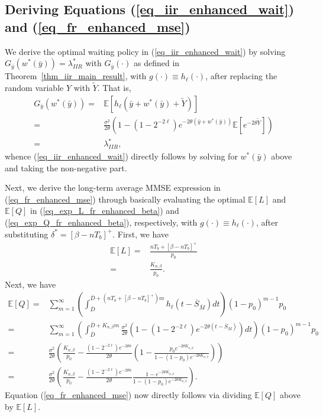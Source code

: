 \documentclass[12pt,journal,onecolumn]{IEEEtran}
\begin{document}
\subsection{Deriving Equations (\ref{eq_iir_enhanced_wait}) and (\ref{eq_fr_enhanced_mse})} \label{apndx_fr_enhanced_mse}

We derive the optimal waiting policy in (\ref{eq_iir_enhanced_wait}) by solving $G_{\bar{y}}\left(w^*(\bar{y})\right)=\lambda^*_{IIR}$ with $G_{\bar{y}}(\cdot)$ as defined in Theorem~\ref{thm_iir_main_result}, with $g(\cdot)\equiv h_\ell(\cdot)$, after replacing the random variable $Y$ with $\tilde{Y}$. That is,
\begin{align}
G_{\bar{y}}\left(w^*(\bar{y})\right)=&\mathbb{E}\left[h_{\ell}\left(\bar{y}+w^*(\bar{y})+\tilde{Y}\right)\right] \nonumber \\
=&\frac{\sigma^2}{2\theta}\left(1-\left(1-2^{-2\ell}\right)e^{-2\theta\left(\bar{y}+w^*(\bar{y})\right)}\mathbb{E}\left[e^{-2\theta\tilde{Y}}\right]\right) \nonumber \\
=&\lambda^*_{IIR},
\end{align}
whence (\ref{eq_iir_enhanced_wait}) directly follows by solving for $w^*(\bar{y})$ above and taking the non-negative part.

Next, we derive the long-term average MMSE expression in (\ref{eq_fr_enhanced_mse}) through basically evaluating the optimal $\mathbb{E}[L]$ and $\mathbb{E}[Q]$ in (\ref{eq_exp_L_fr_enhanced_beta}) and (\ref{eq_exp_Q_fr_enhanced_beta}), respectively, with $g(\cdot)\equiv h_\ell(\cdot)$, after substituting $\delta^*=\left[\beta-nT_b\right]^+$. First, we have
\begin{align}
\mathbb{E}[L]=&\frac{nT_b+\left[\beta-nT_b\right]^+}{p_0} \nonumber \\
=&\frac{K_{n,\beta}}{p_0}.
\end{align}
Next, we have
\begin{align}
\mathbb{E}[Q]=&\sum_{m=1}^\infty\left(\int_{\overline{D}}^{\overline{D}+\left(nT_b+\left[\beta-nT_b\right]^+\right)m}h_{\ell}\left(t-\overline{S}_{\bar{M}}\right)dt\right)(1-p_0)^{m-1}p_0 \nonumber \\
=&\sum_{m=1}^\infty\left(\int_{\overline{D}}^{\overline{D}+K_{n,\beta}m}\frac{\sigma^2}{2\theta}\left(1-\left(1-2^{-2\ell}\right)e^{-2\theta\left(t-\overline{S}_{\bar{M}}\right)}\right)dt\right)(1-p_0)^{m-1}p_0 \nonumber \\
=&\frac{\sigma^2}{2\theta}\left(\frac{K_{n,\beta}}{p_0}-\frac{\left(1-2^{-2\ell}\right)e^{-2\theta\bar{n}}}{2\theta}\left(1-\frac{p_0e^{-2\theta K_{n,\beta}}}{1-(1-p_0)e^{-2\theta K_{n,\beta}}}\right)\right) \nonumber \\
=&\frac{\sigma^2}{2\theta}\left(\frac{K_{n,\beta}}{p_0}-\frac{\left(1-2^{-2\ell}\right)e^{-2\theta\bar{n}}}{2\theta}\frac{1-e^{-2\theta K_{n,\beta}}}{1-(1-p_0)e^{-2\theta K_{n,\beta}}}\right).
\end{align}
Equation (\ref{eq_fr_enhanced_mse}) now directly follows via dividing $\mathbb{E}[Q]$ above by $\mathbb{E}[L]$.
\end{document}
